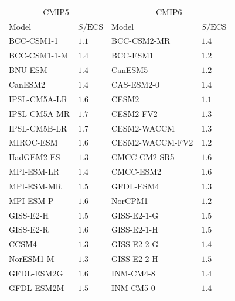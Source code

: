 \begin{table}
   \centering
   \begin{tabular}{llll}
     \toprule
     \multicolumn{2}{c}{CMIP5}               & \multicolumn{2}{c}{CMIP6}            \\
     Model              & $S/\mathrm{ECS}$ & Model       & $S/\mathrm{ECS}$         \\
     \midrule
     BCC-CSM1-1         & $1.1$            & BCC-CSM2-MR     & $1.4$               \\
     BCC-CSM1-1-M       & $1.4$            & BCC-ESM1        & $1.2$               \\
     BNU-ESM            & $1.4$            & CanESM5         & $1.2$               \\
     CanESM2            & $1.4$            & CAS-ESM2-0      & $1.4$               \\
     IPSL-CM5A-LR       & $1.6$            & CESM2           & $1.1$               \\
     IPSL-CM5A-MR       & $1.7$            & CESM2-FV2       & $1.3$               \\
     IPSL-CM5B-LR       & $1.7$            & CESM2-WACCM     & $1.3$               \\
     MIROC-ESM          & $1.6$            & CESM2-WACCM-FV2 & $1.2$               \\
     HadGEM2-ES         & $1.3$            & CMCC-CM2-SR5    & $1.6$               \\
     MPI-ESM-LR         & $1.4$            & CMCC-ESM2       & $1.6$               \\
     MPI-ESM-MR         & $1.5$            & GFDL-ESM4       & $1.3$               \\
     MPI-ESM-P          & $1.6$            & NorCPM1         & $1.2$               \\
     GISS-E2-H          & $1.5$            & GISS-E2-1-G     & $1.5$               \\
     GISS-E2-R          & $1.6$            & GISS-E2-1-H     & $1.5$               \\
     CCSM4              & $1.3$            & GISS-E2-2-G     & $1.4$               \\
     NorESM1-M          & $1.3$            & GISS-E2-2-H     & $1.5$               \\
     GFDL-ESM2G         & $1.6$            & INM-CM4-8       & $1.4$               \\
     GFDL-ESM2M         & $1.5$            & INM-CM5-0       & $1.4$               \\

\end{tabular}
\end{table}
